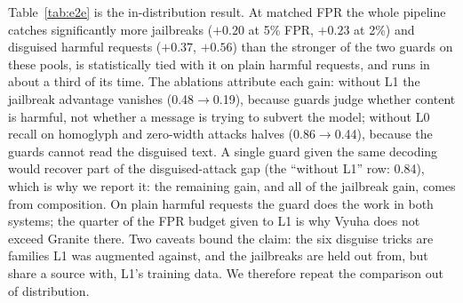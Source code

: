 \documentclass[11pt]{article}
\begin{document}
\begin{table}[t]
\centering\footnotesize\setlength{\tabcolsep}{4pt}
\caption{Head-on, end-to-end comparison at matched benign FPR (held-out FPR 5.3--5.4\% and 2.1--2.2\%
for every system). Vyuha's mean latency is 203\,ms per request vs 595\,ms for Granite~4.1 on one T4
(95\% benign / 5\% attack traffic). Bold: significant difference from Granite~4.1 alone (paired, 500
splits). Disguised = six obfuscation tricks; Granite~4.1 alone catches 0.01 of Base64-encoded requests,
Vyuha 1.00.}
\label{tab:e2e}
\end{table}

Table~\ref{tab:e2e} is the in-distribution result. At matched FPR the whole pipeline catches significantly more
jailbreaks ($+0.20$ at 5\% FPR, $+0.23$ at 2\%) and disguised harmful requests ($+0.37$, $+0.56$) than the
stronger of the two guards on these pools, is statistically tied with it on plain harmful requests, and runs in
about a third of its time. The ablations attribute each gain: without L1 the jailbreak advantage vanishes
(0.48$\rightarrow$0.19), because guards judge whether content is harmful, not whether a message is trying
to subvert the model; without L0 recall on homoglyph and zero-width attacks halves (0.86$\rightarrow$0.44),
because the guards cannot read the disguised text. A single guard given the same decoding would recover
part of the disguised-attack gap (the ``without L1'' row: 0.84), which is why we report it: the remaining
gain, and all of the jailbreak gain, comes from composition. On plain harmful requests the guard does the
work in both systems; the quarter of the FPR budget given to L1 is why Vyuha does not exceed Granite there.
Two caveats bound the claim: the six disguise tricks are families L1 was augmented against, and the
jailbreaks are held out from, but share a source with, L1's training data. We therefore repeat the
comparison out of distribution.
\end{document}
